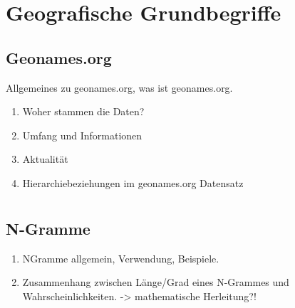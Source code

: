 	\section{Geografische Grundbegriffe}

		\subsection{Geonames.org}
			Allgemeines zu geonames.org, was ist geonames.org. 
			\begin{enumerate}
				\item Woher stammen die Daten?
				\item Umfang und Informationen
				\item Aktualität
				\item Hierarchiebeziehungen im geonames.org Datensatz
			\end{enumerate}	

		\subsection{}	

	\section{} 
		\subsection{N-Gramme}
			\begin{enumerate}
				\item NGramme allgemein, Verwendung, Beispiele. 
				\item {} Zusammenhang zwischen Länge/Grad eines N-Grammes und Wahrscheinlichkeiten. -> mathematische Herleitung?!
			\end{enumerate}

